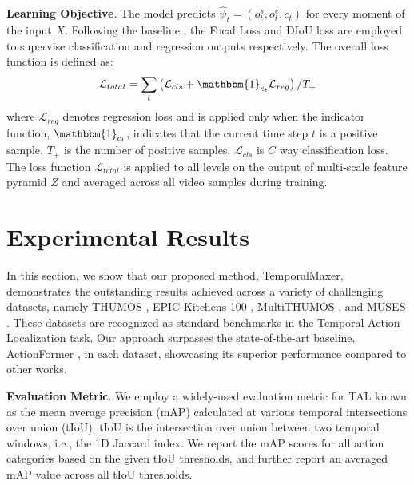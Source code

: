 \documentclass[10pt,twocolumn,letterpaper]{article}
\begin{document}
\textbf{Learning Objective}. The model predicts $\hat{\psi}_t = (o_t^s, o_t^e, c_t)$ for every moment of the input $X$. Following the baseline \cite{zhang2022actionformer}, the Focal Loss \cite{lin2017focal} and DIoU loss \cite{zheng2020distance} are employed to supervise classification and regression outputs respectively. The overall loss function is defined as:
\begin{equation}
\mathcal{L}_{total}=\sum_t\left(\mathcal{L}_{cls}+\mathbbm{1}_{c_t} \mathcal{L}_{reg}\right) / T_{+}
\end{equation}
where $\mathcal{L}_{reg}$ denotes regression loss and is applied only when the indicator function, $\mathbbm{1}_{c_t}$, indicates that the current time step $t$ is a positive sample. $T_{+}$ is the number of positive samples. $\mathcal{L}_{cls}$ is $C$ way classification loss. The loss function $\mathcal{L}_{total}$ is applied to all levels on the output of multi-scale feature pyramid $Z$ and averaged across all video samples during training.



 \section{Experimental Results}
In this section, we show that our proposed method, TemporalMaxer, demonstrates the outstanding results achieved across a variety of challenging datasets, namely THUMOS \cite{idrees2017thumos}, EPIC-Kitchens 100 \cite{damen2020rescaling}, MultiTHUMOS \cite{yeung2018every}, and MUSES \cite{liu2021multi}. These datasets are recognized as standard benchmarks in the Temporal Action Localization task. Our approach surpasses the state-of-the-art baseline, ActionFormer \cite{zhang2022actionformer}, in each dataset, showcasing its superior performance compared to other works.

\textbf{Evaluation Metric}. We employ a widely-used evaluation metric for TAL known as the mean average precision (mAP) calculated at various temporal intersections over union (tIoU). tIoU is the intersection over union between two temporal windows, i.e., the 1D Jaccard index. We report the mAP scores for all action categories based on the given tIoU thresholds, and further report an averaged mAP value across all tIoU thresholds.
\end{document}
